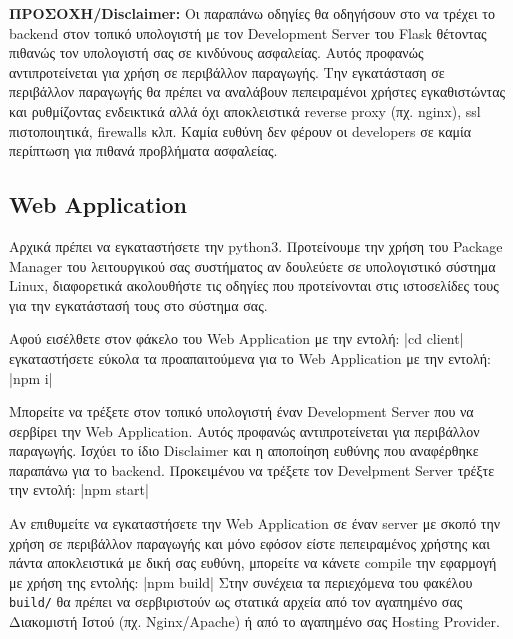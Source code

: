 \documentclass[a4paper]{article}
\begin{document}
\textbf{ΠΡΟΣΟΧΗ/Disclaimer:} Οι παραπάνω οδηγίες θα οδηγήσουν στο να τρέχει το backend στον τοπικό υπολογιστή με τον Development Server του Flask θέτοντας πιθανώς τον υπολογιστή σας σε κινδύνους ασφαλείας. Αυτός προφανώς αντιπροτείνεται για χρήση σε περιβάλλον παραγωγής. Την εγκατάσταση σε περιβάλλον παραγωγής θα πρέπει να αναλάβουν πεπειραμένοι χρήστες εγκαθιστώντας και ρυθμίζοντας ενδεικτικά αλλά όχι αποκλειστικά reverse proxy (πχ. nginx), ssl πιστοποιητικά, firewalls κλπ. Καμία ευθύνη δεν φέρουν οι developers σε καμία περίπτωση για πιθανά προβλήματα ασφαλείας.

\subsection{Web Application}

\par Αρχικά πρέπει να εγκαταστήσετε την python3. Προτείνουμε την χρήση του Package Manager του λειτουργικού σας συστήματος αν δουλεύετε σε υπολογιστικό σύστημα Linux, διαφορετικά ακολουθήστε τις οδηγίες που προτείνονται στις ιστοσελίδες τους για την εγκατάστασή τους στο σύστημα σας.

\par Αφού εισέλθετε στον φάκελο του Web Application με την εντολή:
|cd client|
εγκαταστήσετε εύκολα τα προαπαιτούμενα για το Web Application με την εντολή:
|npm i|

\par Μπορείτε να τρέξετε στον τοπικό υπολογιστή έναν Development Server που να σερβίρει την Web Application. Αυτός προφανώς αντιπροτείνεται για περιβάλλον παραγωγής. Ισχύει το ίδιο Disclaimer και η αποποίηση ευθύνης που αναφέρθηκε παραπάνω για το backend. Προκειμένου να τρέξετε τον Develpment Server τρέξτε την εντολή:
|npm start|

\par Αν επιθυμείτε να εγκαταστήσετε την Web Application σε έναν server με σκοπό την χρήση σε περιβάλλον παραγωγής και μόνο εφόσον είστε πεπειραμένος χρήστης και πάντα αποκλειστικά με δική σας ευθύνη, μπορείτε να κάνετε compile την εφαρμογή με χρήση της εντολής:
|npm build|
Στην συνέχεια τα περιεχόμενα του φακέλου \texttt{build/} θα πρέπει να σερβιριστούν ως στατικά αρχεία από τον αγαπημένο σας Διακομιστή Ιστού (πχ. Nginx/Apache) ή από το αγαπημένο σας Hosting Provider.
\end{document}
